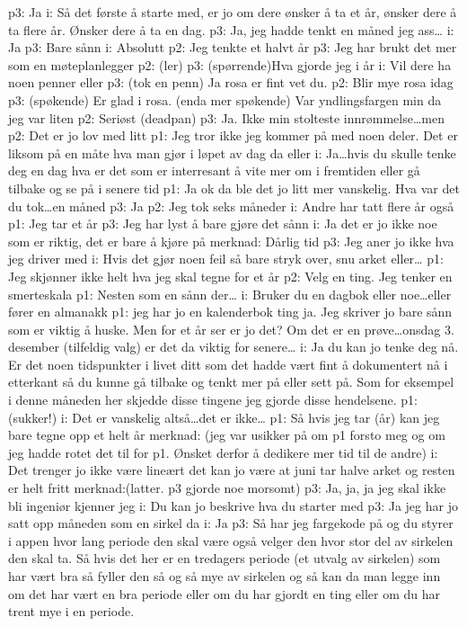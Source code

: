 \documentclass[11pt,UKenglish, a4paper]{article}
\begin{document}
p3: Ja
i: Så det første å starte med, er jo om dere ønsker å ta et år, ønsker dere å ta flere år. Ønsker dere å ta en dag.
p3: Ja, jeg hadde tenkt en måned jeg ass\dots
i: Ja
p3: Bare sånn
i: Absolutt
p2: Jeg tenkte et halvt år
p3: Jeg har brukt det mer som en møteplanlegger
p2: (ler)
p3: (spørrende)Hva gjorde jeg i år
i: Vil dere ha noen penner eller 
p3: (tok en penn) Ja rosa er fint vet du.
p2: Blir mye rosa idag
p3: (spøkende) Er glad i rosa. (enda mer spøkende) Var yndlingsfargen min da jeg var liten
p2: Seriøst (deadpan)
p3: Ja. Ikke min stolteste innrømmelse\dots men
p2: Det er jo lov med litt
p1: Jeg tror ikke jeg kommer på med noen deler. Det er liksom på en måte hva man gjør i løpet av dag da eller
i: Ja\dots hvis du skulle tenke deg en dag hva er det som er interresant å vite mer om i fremtiden eller gå tilbake og se på i senere tid
p1: Ja ok da ble det jo litt mer vanskelig. Hva var det du tok\dots en måned
p3: Ja
p2: Jeg tok seks måneder
i: Andre har tatt flere år også 
p1: Jeg tar et år
p3: Jeg har lyst å bare gjøre det sånn
i: Ja det er jo ikke noe som er riktig, det er bare å kjøre på 
merknad: Dårlig tid
p3: Jeg aner jo ikke hva jeg driver med
i: Hvis det gjør noen feil så bare stryk over, snu arket eller\dots
p1: Jeg skjønner ikke helt hva jeg skal tegne for et år
p2: Velg en ting. Jeg tenker en smerteskala
p1: Nesten som en sånn der\dots
i: Bruker du en dagbok eller noe\dots eller fører en almanakk
p1: jeg har jo en kalenderbok ting ja. Jeg skriver jo bare sånn som er viktig å huske. Men for et år ser er jo det? Om det er en prøve\dots onsdag 3. desember (tilfeldig valg) er det da viktig for senere\dots
i: Ja du kan jo tenke deg nå. Er det noen tidspunkter i livet ditt som det hadde vært fint å dokumentert nå i etterkant så du kunne gå tilbake og tenkt mer på eller sett på. Som for eksempel i denne måneden her skjedde disse tingene jeg gjorde disse hendelsene.
p1: (sukker!)
i: Det er vanskelig altså\dots det er ikke\dots
p1: Så hvis jeg tar (år) kan jeg bare tegne opp et helt år
merknad: (jeg var usikker på om p1 forsto meg og om jeg hadde rotet det til for p1. Ønsket derfor å dedikere mer tid til de andre)
i: Det trenger jo ikke være lineært det kan jo være at juni tar halve arket og resten er helt fritt
merknad:(latter. p3 gjorde noe morsomt)
p3: Ja, ja, ja jeg skal ikke bli ingeniør kjenner jeg
i: Du kan jo beskrive hva du starter med
p3: Ja jeg har jo satt opp måneden som en sirkel da
i: Ja
p3: Så har jeg fargekode på og du styrer i appen hvor lang periode den skal være også velger den hvor stor del av sirkelen den skal ta. Så hvis det her er en tredagers periode (et utvalg av sirkelen) som har vært bra så fyller den så og så mye av sirkelen og så kan da man legge inn om det har vært en bra periode eller om du har gjordt en ting eller om du har trent mye i en periode. 
\end{document}
